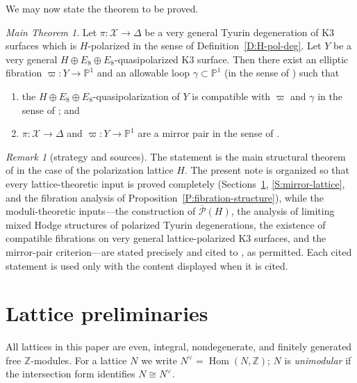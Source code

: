 \documentclass[11pt]{amsart}
\theoremstyle{plain}
\theoremstyle{definition}
\theoremstyle{remark}
\newtheorem{remark}[theorem]{Remark}
\newtheorem*{maintheorem*}{Main Theorem}
\numberwithin{equation}{section}
\begin{document}
We may now state the theorem to be proved.

\begin{maintheorem*}
Let \(\pi\colon\mathcal X\to\Delta\) be a very general Tyurin degeneration of
K3 surfaces which is \(H\)-polarized in the sense of
Definition~\ref{D:H-pol-deg}. Let \(Y\) be a very general
\(H\oplus E_{8}\oplus E_{8}\)-quasipolarized K3 surface. Then there exist an
elliptic fibration \(\varpi\colon Y\to\mathbb P^{1}\) and an allowable loop
\(\gamma\subset\mathbb P^{1}\) (in the sense of
\cite[Definition 4.11]{dfk3slpms}) such that
\begin{enumerate}
\item the \(H\oplus E_{8}\oplus E_{8}\)-quasipolarization of \(Y\) is
compatible with \(\varpi\) and \(\gamma\) in the sense of
\cite[Definition 4.21]{dfk3slpms}; and
\item \(\pi\colon\mathcal X\to\Delta\) and
\(\varpi\colon Y\to\mathbb P^{1}\) are a mirror pair in the sense of
\cite[Definition 5.1]{dfk3slpms}.
\end{enumerate}
\end{maintheorem*}

\begin{remark}[strategy and sources]\label{R:strategy}
The statement is the main structural theorem of \cite{dfk3slpms} in the case
of the polarization lattice \(H\). The present note is organized so that
every lattice-theoretic input is proved completely (Sections~\ref{S:lattices},
\ref{S:mirror-lattice}, and the fibration analysis of
Proposition~\ref{P:fibration-structure}), while the moduli-theoretic
inputs---the construction of \(\overline{\mathcal P}(H)\), the analysis of
limiting mixed Hodge structures of polarized Tyurin degenerations, the
existence of compatible fibrations on very general lattice-polarized K3
surfaces, and the mirror-pair criterion---are stated precisely and cited to
\cite{cmek3sspt, dfk3slpms}, as permitted. Each cited statement is used only
with the content displayed when it is cited.
\end{remark}

\section{Lattice preliminaries}\label{S:lattices}

All lattices in this paper are even, integral, nondegenerate, and
finitely generated free \(\mathbb Z\)-modules. For a lattice \(N\) we write
\(N^{\vee}=\operatorname{Hom}(N,\mathbb Z)\); \(N\) is {\em unimodular} if the
intersection form identifies \(N\cong N^{\vee}\).
\end{document}
